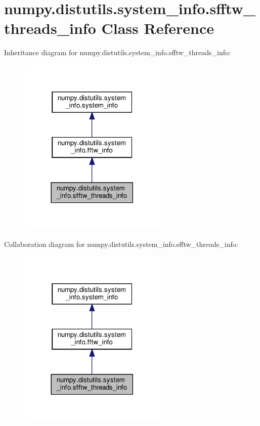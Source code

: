 \hypertarget{classnumpy_1_1distutils_1_1system__info_1_1sfftw__threads__info}{}\section{numpy.\+distutils.\+system\+\_\+info.\+sfftw\+\_\+threads\+\_\+info Class Reference}
\label{classnumpy_1_1distutils_1_1system__info_1_1sfftw__threads__info}


Inheritance diagram for numpy.\+distutils.\+system\+\_\+info.\+sfftw\+\_\+threads\+\_\+info\+:
\nopagebreak
\begin{figure}[H]
\begin{center}
\leavevmode
\includegraphics[width=201pt]{classnumpy_1_1distutils_1_1system__info_1_1sfftw__threads__info__inherit__graph}
\end{center}
\end{figure}


Collaboration diagram for numpy.\+distutils.\+system\+\_\+info.\+sfftw\+\_\+threads\+\_\+info\+:
\nopagebreak
\begin{figure}[H]
\begin{center}
\leavevmode
\includegraphics[width=201pt]{classnumpy_1_1distutils_1_1system__info_1_1sfftw__threads__info__coll__graph}
\end{center}
\end{figure}
